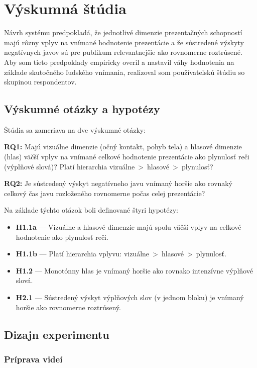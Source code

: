 \chapter{Výskumná štúdia}
\label{chap:vyskum}

Návrh systému predpokladá, že jednotlivé dimenzie prezentačných schopností majú rôzny vplyv na vnímané hodnotenie prezentácie a že sústredené výskyty negatívnych javov sú pre publikum relevantnejšie ako rovnomerne roztrúsené. Aby som tieto predpoklady empiricky overil a nastavil váhy hodnotenia na základe skutočného ľudského vnímania, realizoval som používateľskú štúdiu so skupinou respondentov.

\section{Výskumné otázky a hypotézy}

Štúdia sa zameriava na dve výskumné otázky:

\textbf{RQ1:} Majú vizuálne dimenzie (očný kontakt, pohyb tela) a hlasové dimenzie (hlas) väčší vplyv na vnímané celkové hodnotenie prezentácie ako plynulosť reči (výplňové slová)? Platí hierarchia vizuálne~>~hlasové~>~plynulosť?

\textbf{RQ2:} Je sústredený výskyt negatívneho javu vnímaný horšie ako rovnaký celkový čas javu rozloženého rovnomerne počas celej prezentácie?

Na základe týchto otázok boli definované štyri hypotézy:

\begin{itemize}
    \item \textbf{H1.1a} --- Vizuálne a hlasové dimenzie majú spolu väčší vplyv na celkové hodnotenie ako plynulosť reči.
    \item \textbf{H1.1b} --- Platí hierarchia vplyvu: vizuálne~>~hlasové~>~plynulosť.
    \item \textbf{H1.2} --- Monotónny hlas je vnímaný horšie ako rovnako intenzívne výplňové slová.
    \item \textbf{H2.1} --- Sústredený výskyt výplňových slov (v jednom bloku) je vnímaný horšie ako rovnomerne roztrúsený.
\end{itemize}

\section{Dizajn experimentu}

\subsection{Príprava videí}

